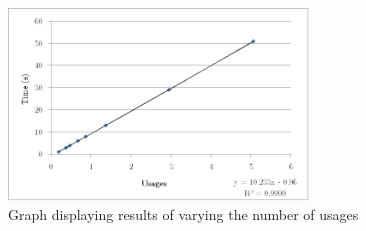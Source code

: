 \begin{figure}[h]
\begin{center}

\includegraphics[width=8cm]{scaling}

\caption{Graph displaying results of varying the number of usages}
\label{Fig:comparerefs}
\end{center}
\end{figure}
